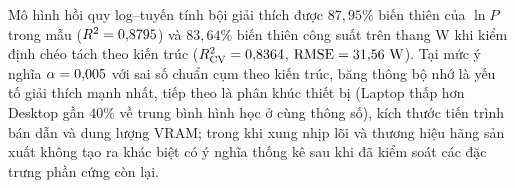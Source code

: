 Mô hình hồi quy log--tuyến tính bội giải thích được $87{,}95\%$ biến thiên của $\ln P$ trong mẫu
($R^2 = 0{,}8795$) và $83{,}64\%$ biến thiên công suất trên thang W khi kiểm định chéo tách
theo kiến trúc ($R^2_{\mathrm{CV}} = 0{,}8364$, $\mathrm{RMSE} = 31{,}56\text{ W}$).
Tại mức ý nghĩa $\alpha = 0{,}005$ với sai số chuẩn cụm theo \RegClusters{} kiến trúc, băng
thông bộ nhớ là yếu tố giải thích mạnh nhất, tiếp theo là phân khúc thiết bị (Laptop thấp hơn
Desktop gần $40\%$ về trung bình hình học ở cùng thông số), kích thước tiến trình bán dẫn và dung
lượng VRAM; trong khi xung nhịp lõi và thương hiệu hãng sản xuất không tạo ra khác biệt có ý
nghĩa thống kê sau khi đã kiểm soát các đặc trưng phần cứng còn lại.